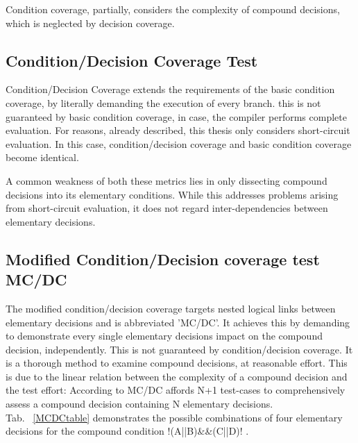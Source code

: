 	Condition coverage, partially, considers the complexity of compound decisions, which is neglected by decision coverage.
	
	\subsection{Condition/Decision Coverage Test}
	Condition/Decision Coverage extends the requirements of the basic condition coverage, by literally demanding the execution of every branch.  this is not guaranteed by basic condition coverage, in case, the compiler performs complete evaluation. For reasons, already described, this thesis only considers short-circuit evaluation. In this case, condition/decision coverage and basic condition coverage become identical.

	A common weakness of both these metrics lies in only dissecting compound decisions into its elementary conditions. While this addresses problems arising from short-circuit evaluation, it does not regard inter-dependencies between elementary decisions.
	
	\subsection{Modified Condition/Decision coverage test MC/DC}
	The modified condition/decision coverage targets nested logical links between elementary decisions and is abbreviated 'MC/DC'. It achieves this by demanding to demonstrate every single elementary decisions impact on the compound decision, independently. This is not guaranteed by condition/decision coverage. It is a thorough method to examine compound decisions, at reasonable effort. This is due to the linear relation between the complexity of a compound decision and the test effort: According to \cite{ChilenskiMiller1994} MC/DC affords N+1 test-cases to comprehensively assess a compound decision containing N elementary decisions. \\

	Tab. ~\ref{MCDCtable} demonstrates the possible combinations of four elementary decisions for the compound condition \lstC !(A||B)\&\&(C||D)! .

